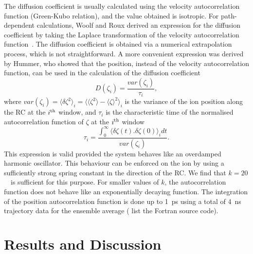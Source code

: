 The diffusion coefficient is usually calculated using the velocity autocorrelation function (Green-Kubo 
relation), and the value obtained is isotropic. For path-dependent calculations, Woolf and Roux 
derived an expression for the diffusion coefficient by taking the Laplace transformation of the 
velocity autocorrelation function~\cite{Woolf1994}. The diffusion coefficient is obtained via a 
numerical extrapolation process, which is not straightforward. A more convenient expression was 
derived by Hummer, who showed that the position, instead of the velocity autocorrelation function, 
can be used in the calculation of the diffusion coefficient~\cite{Hummer2005}
\begin{equation}
 D(\zeta_i) = \frac{var(\zeta_i)}{\tau_i},
 \label{na3:eq3}
\end{equation}
where $var(\zeta_i)= \langle \delta\zeta^2 \rangle_i=\langle \langle\zeta^2\rangle - \langle\zeta
\rangle^2 \rangle_i$ is the variance of the ion position along the RC at the $i^{\rm th}$ window,
and $\tau_i$ is the characteristic time of the normalised autocorrelation function of $\zeta$ at 
the $i^{\rm th}$ window 
\begin{equation}
 \tau_i = \frac{\int_{0}^{\infty} \langle \delta \zeta(t).
 \delta \zeta(0) \rangle_i dt} {var(\zeta_i)}.
 \label{na3:eq4}
\end{equation} 
This expression is valid provided the system behaves like an overdamped harmonic oscillator. This 
behaviour can be enforced on the ion by using a sufficiently strong spring constant in the direction 
of the RC. We find that $k=20$~\spring\ is sufficient for this purpose.  For smaller values of $k$, 
the autocorrelation function does not behave like an exponentially decaying function. The integration 
of the position autocorrelation function is done up to 1~ps using a total of 4~ns trajectory data for 
the ensemble average ( list the Fortran source code).

\section{Results and Discussion}
